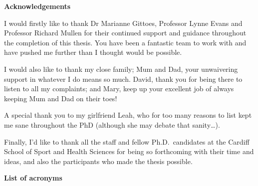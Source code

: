 \documentclass[man,floatsintext]{apa6}
\begin{document}
\clearpage\mbox{}\thispagestyle{empty}

\begin{center}
\textbf{Acknowledgements}
\end{center}

I would firstly like to thank Dr Marianne Gittoes, Professor Lynne Evans and Professor Richard Mullen for their continued support and guidance throughout the completion of this thesis. You have been a fantastic team to work with and have pushed me further than I thought would be possible.

I would also like to thank my close family; Mum and Dad, your unwaivering support in whatever I do means so much. David, thank you for being there to listen to all my complaints; and Mary, keep up your excellent job of always keeping Mum and Dad on their toes!

A special thank you to my girlfriend Leah, who for too many reasons to list kept me sane throughout the PhD (although she may debate that sanity\ldots).

Finally, I'd like to thank all the staff and fellow Ph.D.~candidates at the Cardiff School of Sport and Health Sciences for being so forthcoming with their time and ideas, and also the participants who made the thesis possible.

\clearpage

\begin{flushleft}
{
\tableofcontents
}
\end{flushleft}

\clearpage

\begin{flushleft}
{
\listoftables
}
\end{flushleft}

\clearpage

\begin{flushleft}
{
\listoffigures
}
\end{flushleft}

\clearpage

\begin{center}
\textbf{List of acronyms}
\end{center}

\end{document}
